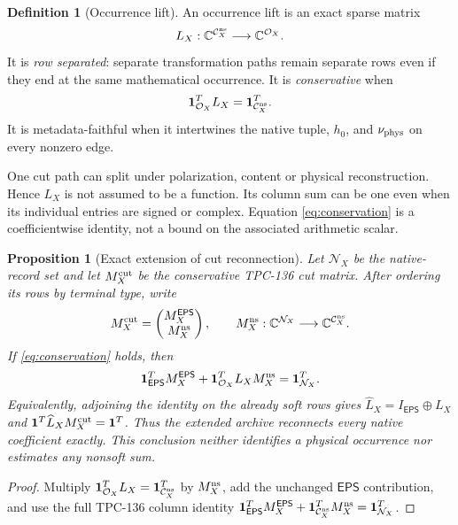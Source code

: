 \documentclass[11pt]{article}
\newtheorem{proposition}[theorem]{Proposition}
\theoremstyle{definition}
\newtheorem{definition}[theorem]{Definition}
\theoremstyle{remark}
\newcommand{\Ccut}{\mathcal C_X^{\rm ns}}
\newcommand{\Occ}{\mathcal O_X}
\newcommand{\one}{\mathbf 1}
\begin{document}
\begin{definition}[Occurrence lift]
An occurrence lift is an exact sparse matrix
\[
 L_X:\mathbb C^{\Ccut}\longrightarrow\mathbb C^{\Occ}.
\]
It is \emph{row separated}: separate transformation paths remain
separate rows even if they end at the same mathematical occurrence.
It is \emph{conservative} when
\begin{equation}
 \one_{\Occ}^{T}L_X=\one_{\Ccut}^{T}.
 \label{eq:conservation}
\end{equation}
It is metadata-faithful when it intertwines the native tuple,
\(h_0\), and \(\nu_{\rm phys}\) on every nonzero edge.
\end{definition}

One cut path can split under polarization, content or physical
reconstruction.  Hence \(L_X\) is not assumed to be a function.  Its
column sum can be one even when its individual entries are signed or
complex.  Equation \eqref{eq:conservation} is a coefficientwise
identity, not a bound on the associated arithmetic scalar.

\begin{proposition}[Exact extension of cut reconnection]
\label{prop:reconnection}
Let \(\mathcal N_X\) be the native-record set and let
\(M_X^{\rm cut}\) be the conservative TPC-136 cut matrix.  After
ordering its rows by terminal type, write
\[
 M_X^{\rm cut}
 =
 \begin{pmatrix}
  M_X^{\mathsf{EPS}}\\
  M_X^{\rm ns}
 \end{pmatrix},
 \qquad
 M_X^{\rm ns}:\mathbb C^{\mathcal N_X}\longrightarrow
 \mathbb C^{\Ccut}.
\]
If \eqref{eq:conservation} holds, then
\begin{equation}
 \one_{\mathsf{EPS}}^TM_X^{\mathsf{EPS}}
 +\one_{\Occ}^TL_XM_X^{\rm ns}
 =\one_{\mathcal N_X}^T.
 \label{eq:extended-reconnection}
\end{equation}
Equivalently, adjoining the identity on the already soft rows gives
\(\widehat L_X=I_{\mathsf{EPS}}\oplus L_X\) and
\(\one^T\widehat L_XM_X^{\rm cut}=\one^T\).
Thus the extended archive reconnects every native coefficient
exactly.  This conclusion neither identifies a physical occurrence
nor estimates any nonsoft sum.
\end{proposition}

\begin{proof}
Multiply \(\one_{\Occ}^TL_X=\one_{\Ccut}^T\) by
\(M_X^{\rm ns}\), add the unchanged \(\mathsf{EPS}\) contribution,
and use the full TPC-136 column identity
\(\one_{\mathsf{EPS}}^TM_X^{\mathsf{EPS}}
+\one_{\Ccut}^TM_X^{\rm ns}=\one_{\mathcal N_X}^T\).
\end{proof}
\end{document}
